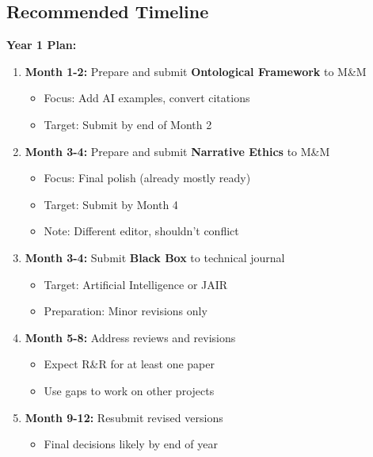 \documentclass[12pt]{article}
\begin{document}
\subsection{Recommended Timeline}

\textbf{Year 1 Plan:}

\begin{enumerate}
\item \textbf{Month 1-2:} Prepare and submit \textbf{Ontological Framework} to M\&M
   \begin{itemize}
   \item Focus: Add AI examples, convert citations
   \item Target: Submit by end of Month 2
   \end{itemize}

\item \textbf{Month 3-4:} Prepare and submit \textbf{Narrative Ethics} to M\&M
   \begin{itemize}
   \item Focus: Final polish (already mostly ready)
   \item Target: Submit by Month 4
   \item Note: Different editor, shouldn't conflict
   \end{itemize}

\item \textbf{Month 3-4:} Submit \textbf{Black Box} to technical journal
   \begin{itemize}
   \item Target: Artificial Intelligence or JAIR
   \item Preparation: Minor revisions only
   \end{itemize}

\item \textbf{Month 5-8:} Address reviews and revisions
   \begin{itemize}
   \item Expect R\&R for at least one paper
   \item Use gaps to work on other projects
   \end{itemize}

\item \textbf{Month 9-12:} Resubmit revised versions
   \begin{itemize}
   \item Final decisions likely by end of year
   \end{itemize}
\end{enumerate}
\end{document}
